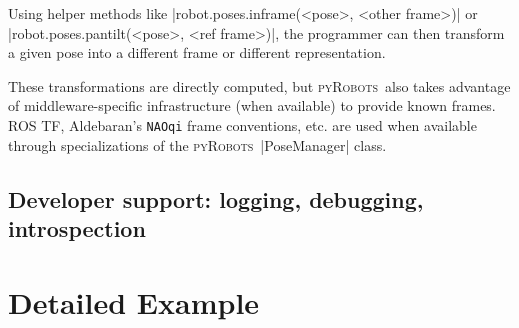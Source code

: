 \documentclass[a4paper, 10pt, conference]{ieeeconf}      %
\newcommand{\pyRobots}{\textsc{pyRobots}\ }
\begin{document}
Using helper methods like \python|robot.poses.inframe(<pose>, <other frame>)| or
\python|robot.poses.pantilt(<pose>, <ref frame>)|, the programmer can then
transform a given pose into a different frame or different representation.

These transformations are directly computed, but \pyRobots also takes advantage
of middleware-specific infrastructure (when available) to provide known frames.
ROS TF, Aldebaran's {\tt NAOqi} frame conventions, etc. are used when available
through specializations of the \pyRobots \python|PoseManager| class.

\subsection{Developer support: logging, debugging, introspection}
\label{}

\section{Detailed Example}
\end{document}
